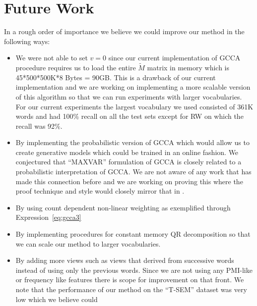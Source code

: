 \documentclass[11pt]{article}
\begin{document}
\section{Future Work}
\label{sec:futurework}
In a rough order of importance we believe we could improve our method in the following ways:
\begin{itemize}[leftmargin=*]
  \itemsep-0.1em
  \renewcommand\labelitemi{--}
  \item We were
  not able to set $v=0$ since our current implementation of GCCA
  procedure requires us to load the entire $\tilde{M}$ matrix in
  memory which is 45*500*500K*8 Bytes = 90GB.
  This is a drawback of our current implementation and we
  are working on implementing a more scalable version of this
  algorithm so that we can run experiments with larger
  vocabularies. For our current experiments the largest vocabulary we
  used consisted of 361K words and had 100\% recall on all the test
  sets except for RW on which the recall was 92\%.
\item By implementing the probabilistic version of GCCA which would
  allow us to create generative models which could be trained in an
  online fashion. We conjectured that ``MAXVAR'' formulation of GCCA is closely related to a probabilistic interpretation of GCCA. We are not aware of any work
that has made this connection before and we are working on proving this where the proof technique and style would closely mirror that in \cite{bach2005probabilistic}.
\item By using count dependent non-linear weighting as exemplified
  through Expression~\ref{eq:gcca3}
\item By implementing procedures for constant memory QR decomposition so that we can scale our method to larger vocabularies. 
\item By adding more views such as views that derived from successive
  words instead of  using only the previous words. Since we are not using
  any PMI-like or frequency like features there is scope for
  improvement on that front.  We note that the performance of our
  method on the ``T-SEM'' dataset was very low which we believe could

\end{itemize}
\end{document}
